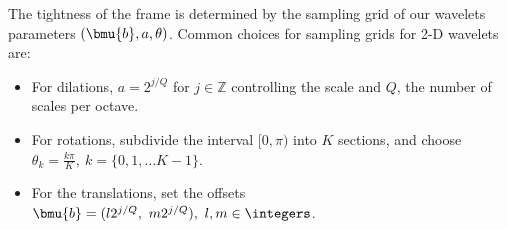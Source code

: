 The tightness of the frame is determined by the sampling grid of our wavelets
parameters $(\bmu{b}, a, \theta)$.
Common choices for sampling grids for 2-D wavelets are\cite[Section
2.2]{antoine_two-dimensional_2004}:
\begin{itemize}
  \item For dilations, $a = 2^{j/Q}$ for $j\in \mathbb{Z}$
    controlling the scale and $Q$, the number of scales per octave.
  \item For rotations, subdivide the interval $[0, \pi)$ into $K$ sections,
    and choose $\theta_k = \frac{k\pi}{K},\ k = \{0, 1, \ldots K-1\}$.
  \item For the translations, set the offsets $\bmu{b} =
    (l2^{j/Q},\ m2^{j/Q}),\ l,m \in \integers$.
\end{itemize}



%
